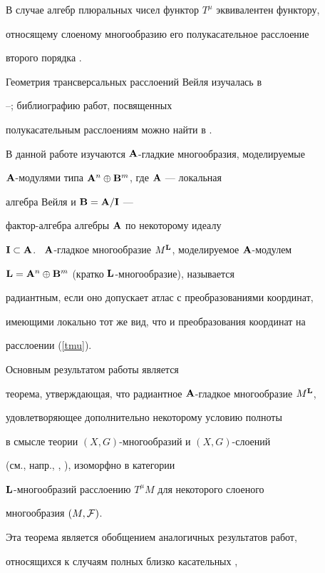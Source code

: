 В случае алгебр плюральных чисел функтор $T^\mu$ эквивалентен функтору,


относящему слоеному многообразию его полукасательное расслоение


второго порядка \cite{Vish}.


Геометрия трансверсальных расслоений Вейля изучалась в 


\cite{Wol}--\cite{VSh14}; библиографию работ, посвященных


полукасательным расслоениям можно найти в \cite{Vish}.





В данной работе изучаются ${\bold A}$-гладкие многообразия, моделируемые


${\bold A}$-модулями типа ${\bold A}^n\oplus{\bold B}^m$, где ${\bold A}$ --- локальная


алгебра Вейля и ${\bold B}={\bold A}/{\bold I}$ ---


фактор-алгебра алгебры ${\bold A}$ по некоторому идеалу


${\bold I}\subset{\bold A}$. \ ${\bold A}$-гладкое многообразие $M^{{\bold L}}$, моделируемое ${\bold A}$-модулем


${\bold L}={\bold A}^n\oplus{\bold B}^m$ (кратко ${\bold L}$-многообразие), называется


радиантным, если оно допускает атлас с преобразованиями координат,


имеющими локально тот же вид, что и преобразования координат на


расслоении (\ref{tmu}).





Основным результатом работы является


теорема, утверждающая, что радиантное ${\bold A}$-гладкое многообразие $M^{{\bold L}}$,


удовлетворяющее дополнительно некоторому условию полноты


в смысле теории $(X,G)$-многообразий и $(X,G)$-слоений


(см., напр., \cite{Apan}, \cite{Mal3}), изоморфно в категории\linebreak


${\bold L}$-многообразий расслоению $T^\mu M$ для некоторого слоеного


многообразия $(M,{\cal F})$.





Эта теорема является обобщением аналогичных результатов работ,


относящихся к случаям полных близко касательных \cite{Br-Cl},


